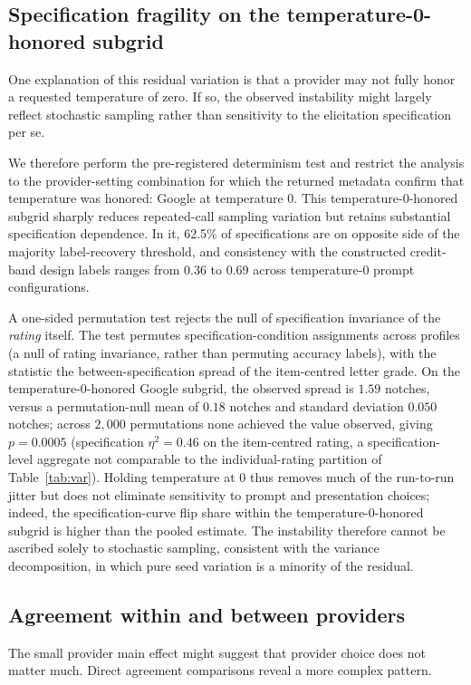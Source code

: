 \documentclass[a4paper,fleqn]{cas-sc}
\begin{document}
\subsection{Specification fragility on the temperature-0-honored subgrid}
One explanation of this residual variation is that a provider may not fully honor a requested
temperature of zero. If so, the observed instability might largely reflect stochastic sampling rather
than sensitivity to the elicitation specification per se.

We therefore perform the pre-registered determinism test and restrict the analysis to the
provider-setting combination for which the returned metadata confirm that temperature was honored: Google
at temperature 0. This temperature-0-honored subgrid sharply reduces repeated-call sampling variation but
retains substantial specification dependence. In it, 62.5\% of specifications are on opposite side of the majority
label-recovery threshold, and consistency with the constructed credit-band design labels ranges from 0.36 to
0.69 across temperature-0 prompt configurations.

A one-sided permutation test rejects the null of specification invariance of the \emph{rating} itself.
The test permutes specification-condition assignments across profiles (a null of rating invariance, rather
than permuting accuracy labels), with the statistic the between-specification spread of the item-centred
letter grade. On the temperature-0-honored Google subgrid, the observed spread is $1.59$ notches, versus
a permutation-null mean of $0.18$ notches and standard deviation $0.050$ notches; across $2{,}000$ permutations
none achieved the value observed, giving $p=0.0005$ (specification $\eta^2=0.46$ on the item-centred
rating, a specification-level aggregate not comparable to the individual-rating partition of
Table~\ref{tab:var}). Holding temperature at 0 thus removes much of the run-to-run jitter but does not eliminate
sensitivity to prompt and presentation choices; indeed, the specification-curve flip share within the
temperature-0-honored subgrid is higher than the pooled estimate. The instability therefore cannot be ascribed
solely to stochastic sampling, consistent with the variance decomposition, in which pure seed variation
is a minority of the residual.

\subsection{Agreement within and between providers}\label{sec:agreement}
The small provider main effect might suggest that provider choice does not matter much. Direct agreement
comparisons reveal a more complex pattern.
\end{document}
